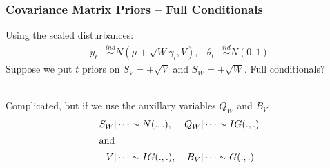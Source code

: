 \documentclass[xcolor=dvipsnames]{beamer}
\begin{document}
\begin{frame}
\frametitle{Covariance Matrix Priors -- Full Conditionals}
Using the scaled disturbances:
\begin{align*}
 y_t &\stackrel{ind}{\sim} N(\mu + \sqrt{W}\gamma_t, V), & \theta_t &\stackrel{iid}{\sim} N(0,1)
\end{align*}
Suppose we put $t$ priors on $S_V=\pm\sqrt{V}$ and $S_W=\pm\sqrt{W}$. Full conditionals?\\~ \pause

Complicated, but if we use the auxillary variables $Q_W$ and $B_V$:
\begin{align*}
S_W|\cdots  &\sim N(.,.),  &Q_W|\cdots  &\sim IG(.,.) \\%
\intertext{and}
V|\cdots  &\sim IG(.,.), & B_V|\cdots  & \sim G(.,.) \\%
\end{align*}
\end{frame}
\end{document}

